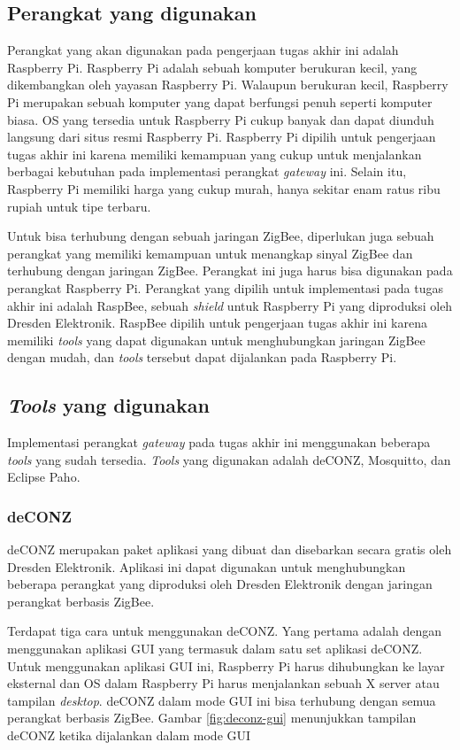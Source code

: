 \subsection{Perangkat yang digunakan}
Perangkat yang akan digunakan pada pengerjaan tugas akhir ini adalah Raspberry Pi. Raspberry Pi adalah sebuah komputer berukuran kecil, yang dikembangkan oleh yayasan Raspberry Pi. Walaupun berukuran kecil, Raspberry Pi merupakan sebuah komputer yang dapat berfungsi penuh seperti komputer biasa. OS yang tersedia untuk Raspberry Pi cukup banyak dan dapat diunduh langsung dari situs resmi Raspberry Pi. Raspberry Pi dipilih untuk pengerjaan tugas akhir ini karena memiliki kemampuan yang cukup untuk menjalankan berbagai kebutuhan pada implementasi perangkat \textit{gateway} ini. Selain itu, Raspberry Pi memiliki harga yang cukup murah, hanya sekitar enam ratus ribu rupiah untuk tipe terbaru. 

Untuk bisa terhubung dengan sebuah jaringan ZigBee, diperlukan juga sebuah perangkat yang memiliki kemampuan untuk menangkap sinyal ZigBee dan terhubung dengan jaringan ZigBee. Perangkat ini juga harus bisa digunakan pada perangkat Raspberry Pi. Perangkat yang dipilih untuk implementasi pada tugas akhir ini adalah RaspBee, sebuah \textit{shield} untuk Raspberry Pi yang diproduksi oleh Dresden Elektronik. RaspBee dipilih untuk pengerjaan tugas akhir ini karena memiliki \textit{tools} yang dapat digunakan untuk menghubungkan jaringan ZigBee dengan mudah, dan \textit{tools} tersebut dapat dijalankan pada Raspberry Pi. 

\subsection{\textit{Tools} yang digunakan}
Implementasi perangkat \textit{gateway} pada tugas akhir ini menggunakan beberapa \textit{tools} yang sudah tersedia. \textit{Tools} yang digunakan adalah deCONZ, Mosquitto, dan Eclipse Paho.

\subsubsection{deCONZ}
deCONZ merupakan paket aplikasi yang dibuat dan disebarkan secara gratis oleh Dresden Elektronik. Aplikasi ini dapat digunakan untuk menghubungkan beberapa perangkat yang diproduksi oleh Dresden Elektronik dengan jaringan perangkat berbasis ZigBee. 

Terdapat tiga cara untuk menggunakan deCONZ. Yang pertama adalah dengan menggunakan aplikasi GUI yang termasuk dalam satu set aplikasi deCONZ. Untuk menggunakan aplikasi GUI ini, Raspberry Pi harus dihubungkan ke layar eksternal dan OS dalam Raspberry Pi harus menjalankan sebuah X server atau tampilan \textit{desktop}. deCONZ dalam mode GUI ini bisa terhubung dengan semua perangkat berbasis ZigBee. Gambar \ref{fig:deconz-gui} menunjukkan tampilan deCONZ ketika dijalankan dalam mode GUI

